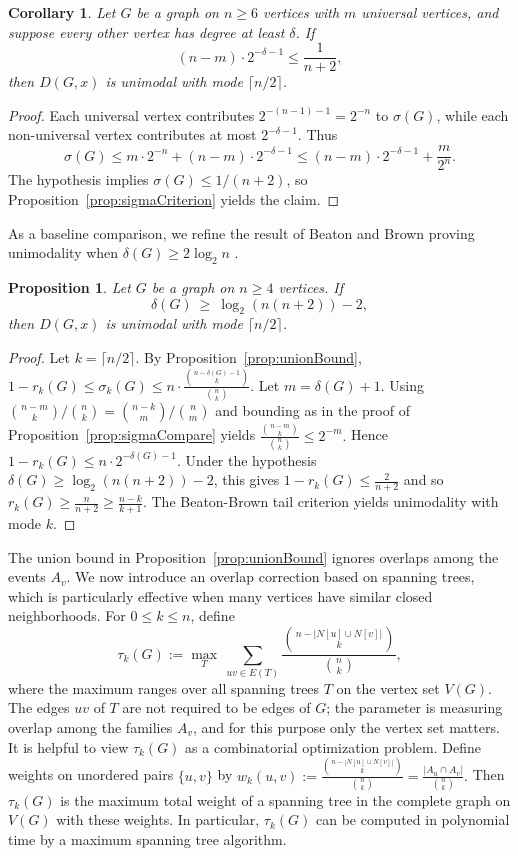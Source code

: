 \documentclass[11pt]{amsart}
\newtheorem{proposition}[theorem]{Proposition}
\newtheorem{corollary}[theorem]{Corollary}
\numberwithin{equation}{section}
\newcommand{\VV}{V(G)}
\begin{document}
\begin{corollary}\label{cor:universalVertices}
Let $G$ be a graph on $n\ge 6$ vertices with $m$ universal vertices, and suppose every other vertex has degree at least $\delta$. If
\[
(n-m)\cdot 2^{-\delta-1}\le \frac{1}{n+2},
\]
then $D(G,x)$ is unimodal with mode $\lceil n/2\rceil$.
\end{corollary}

\begin{proof}
Each universal vertex contributes $2^{-(n-1)-1}=2^{-n}$ to $\sigma(G)$, while each non-universal vertex contributes at most $2^{-\delta-1}$. Thus
\[
\sigma(G)\le m\cdot 2^{-n}+(n-m)\cdot 2^{-\delta-1}\le (n-m)\cdot 2^{-\delta-1}+\frac{m}{2^n}.
\]
The hypothesis implies $\sigma(G)\le 1/(n+2)$, so Proposition~\ref{prop:sigmaCriterion} yields the claim.
\end{proof}

As a baseline comparison, we refine the result of Beaton and Brown proving unimodality when $\delta(G)\ge 2\log_2 n$ \cite{BeatonBrown2022}.

\begin{proposition}\label{prop:mindegLog}
Let $G$ be a graph on $n\ge 4$ vertices. If
\[
\delta(G)\ \ge\ \log_2(n(n+2)) - 2,
\]
then $D(G,x)$ is unimodal with mode $\lceil n/2\rceil$.
\end{proposition}

\begin{proof}
Let $k=\lceil n/2\rceil$. By Proposition~\ref{prop:unionBound}, $1-r_k(G)\le \sigma_k(G)\le n\cdot \frac{\binom{n-\delta(G)-1}{k}}{\binom{n}{k}}.$ Let $m=\delta(G)+1$. Using $\binom{n-m}{k}/\binom{n}{k}=\binom{n-k}{m}/\binom{n}{m}$ and bounding as in the proof of Proposition~\ref{prop:sigmaCompare} yields $\frac{\binom{n-m}{k}}{\binom{n}{k}}\le 2^{-m}.$ Hence $1-r_k(G)\le n\cdot 2^{-\delta(G)-1}$. Under the hypothesis $\delta(G)\ge \log_2(n(n+2))-2$, this gives $1-r_k(G)\le \frac{2}{n+2}$ and so $r_k(G)\ge \frac{n}{n+2}\ge \frac{n-k}{k+1}$. The Beaton-Brown tail criterion yields unimodality with mode $k$.
\end{proof}
The union bound in Proposition~\ref{prop:unionBound} ignores overlaps among the events $A_v$. We now introduce an overlap correction based on spanning trees, which is particularly effective when many vertices have similar closed neighborhoods. For $0\le k\le n$, define
\begin{equation}\label{eq:tauDef}
\tau_k(G):=\max_{T}\ \sum_{uv\in E(T)}\frac{\binom{n-|N[u]\cup N[v]|}{k}}{\binom{n}{k}},
\end{equation}
where the maximum ranges over all spanning trees $T$ on the vertex set $\VV$. The edges $uv$ of $T$ are not required to be edges of $G$; the parameter is measuring overlap among the families $A_v$, and for this purpose only the vertex set matters. It is helpful to view $\tau_k(G)$ as a combinatorial optimization problem.
Define weights on unordered pairs $\{u,v\}$ by $w_k(u,v):=\frac{\binom{n-|N[u]\cup N[v]|}{k}}{\binom{n}{k}}=\frac{|A_u\cap A_v|}{\binom{n}{k}}.$ Then $\tau_k(G)$ is the maximum total weight of a spanning tree in the complete graph on $\VV$ with these weights.
In particular, $\tau_k(G)$ can be computed in polynomial time by a maximum spanning tree algorithm.
\end{document}

